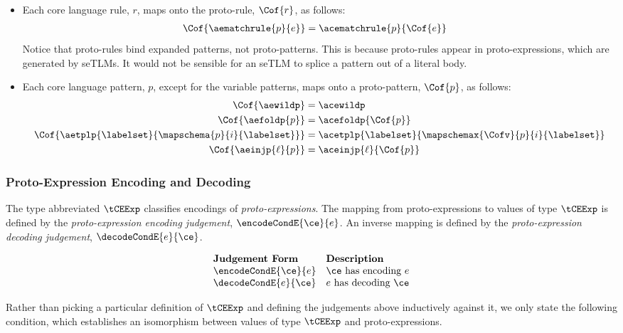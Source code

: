   \begin{grayparbox}
  \begin{itemize}
  \item Each core language rule, $r$, maps onto the proto-rule, $\Cof{r}$, as follows:
  \begin{align*}
  \Cof{\aematchrule{p}{e}} & = \acematchrule{p}{\Cof{e}}
  \end{align*}
  Notice that proto-rules bind expanded patterns, not proto-patterns. This is because proto-rules appear in proto-expressions, which are generated by seTLMs. It would not be sensible for an seTLM to splice a pattern out of a literal body.
  \item Each core language pattern, $p$, except for the variable patterns, maps onto a proto-pattern, $\Cof{p}$, as follows:
  \begin{align*}
  \Cof{\aewildp} & = \acewildp\\
  \Cof{\aefoldp{p}} & = \acefoldp{\Cof{p}}\\
  \Cof{\aetplp{\labelset}{\mapschema{p}{i}{\labelset}}} & = \acetplp{\labelset}{\mapschemax{\Cofv}{p}{i}{\labelset}}\\
  \Cof{\aeinjp{\ell}{p}} & = \aceinjp{\ell}{\Cof{p}}
  \end{align*}
\end{itemize}
\end{grayparbox}

\subsubsection{Proto-Expression Encoding and Decoding}
The type abbreviated $\tCEExp$ classifies encodings of \emph{proto-expressions}. The mapping from proto-expressions to values of type $\tCEExp$ is defined by the \emph{proto-expression encoding judgement}, $\encodeCondE{\ce}{e}$. An inverse mapping is defined by the \emph{proto-expression decoding judgement}, $\decodeCondE{e}{\ce}$.

\[\begin{array}{ll}
\textbf{Judgement Form} & \textbf{Description}\\
\encodeCondE{\ce}{e} & \text{$\ce$ has encoding $e$}\\
\decodeCondE{e}{\ce} & \text{$e$ has decoding $\ce$}
\end{array}\]

Rather than picking a particular definition of $\tCEExp$ and defining the judgements above inductively against it, we only state the following condition, which establishes an isomorphism between values of type $\tCEExp$ and proto-expressions.

